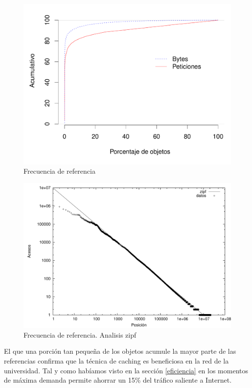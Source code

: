 \documentclass[twocolumn]{Jornadas}
\begin{document}
\begin{figure}[ht!]
\centering
\includegraphics[scale=0.30]{figures/ObjectPopularityCum_full.pdf}
\caption{Frecuencia de referencia}
\label{fig:ObjectPopu}
\end{figure}
\begin{figure}[t]
\centering
\includegraphics[scale=0.30]{figures/zipf.pdf} 
\caption{Frecuencia de referencia. Analisis zipf}
\label{fig:zipf}
\end{figure}

El que una porción tan pequeña de los objetos acumule la mayor parte de las referencias confirma que la técnica de caching es beneficiosa en la red de la universidad. Tal y como habíamos visto en la sección \ref{eficiencia} en los momentos de máxima demanda permite ahorrar un 15\% del tráfico saliente a Internet.
\end{document}
